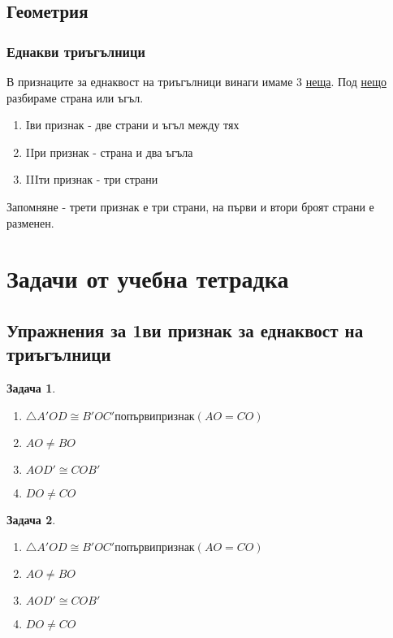 \documentclass{article}
\newtheorem{problem}{Задача}
\begin{document}
	\subsection{Геометрия}
	\subsubsection{Еднакви триъгълници}
	В признаците за еднаквост на триъгълници винаги имаме 3 \underline{неща}. Под \underline{нещо} разбираме страна или ъгъл. 
	\begin{enumerate}
		\item Iви признак - две страни и ъгъл между тях
		\item IIри признак - страна и два ъгъла
		\item IIIти признак - три страни
	\end{enumerate}
	Запомняне - трети признак е три страни, на първи и втори броят страни е разменен.
\section{Задачи от учебна тетрадка}
\subsection{Упражнения за 1ви признак за еднаквост на триъгълници }	

\begin{problem}
	\begin{enumerate}
		\item 	$\triangle A'OD \cong B'OC' по първи признак(AO =CO ) $
		\item $AO \neq BO$ 
		\item $AOD' \cong COB'$
		\item $DO \neq CO$
	\end{enumerate}

\end{problem}


\begin{problem}
	\begin{enumerate}
		\item 	$\triangle A'OD \cong B'OC' по първи признак(AO =CO ) $
		\item $AO \neq BO$ 
		\item $AOD' \cong COB'$
		\item $DO \neq CO$
	\end{enumerate}
	
\end{problem}
\end{document}
